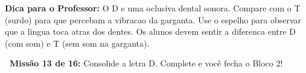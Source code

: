 \begin{dica}
\textbf{Dica para o Professor:} O D e uma oclusiva dental sonora. Compare com o T (surdo) para que percebam a vibracao da garganta. Use o espelho para observar que a lingua toca atras dos dentes. Os alunos devem sentir a diferenca entre D (com som) e T (sem som na garganta).
\end{dica}





\begin{missao}
\textbf{\faGamepad~Miss\~a{}o 13 de 16:} Consolide a letra D. Complete e voc\^e fecha o Bloco 2!
\end{missao}

